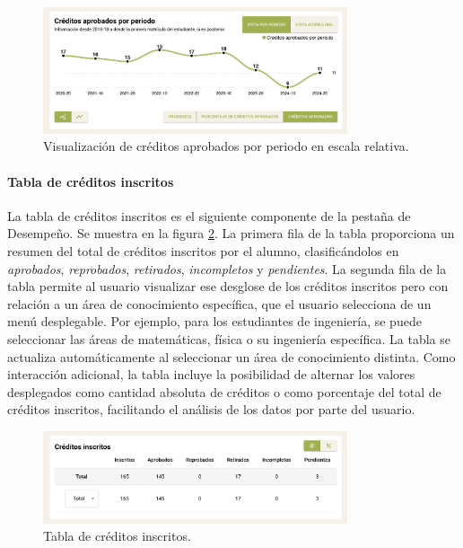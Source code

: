 \begin{enumerate}
  \begin{figure}[H]
    \centering
    \includegraphics[width=0.8\textwidth]{img/nes/creditos_periodo_relativo.png}
    \caption{Visualización de créditos aprobados por periodo en escala relativa.}
    \label{fig:creditos_periodo_relativo}
  \end{figure}
\end{enumerate}

\paragraph{Tabla de créditos inscritos} La tabla de créditos inscritos es el siguiente componente de la pestaña de Desempeño. Se muestra en la figura \ref{fig:tabla_creditos}. La primera fila de la tabla proporciona un resumen del total de créditos inscritos por el alumno, clasificándolos en \textit{aprobados}, \textit{reprobados}, \textit{retirados}, \textit{incompletos} y \textit{pendientes}. La segunda fila de la tabla permite al usuario visualizar ese desglose de los créditos inscritos pero con relación a un área de conocimiento específica, que el usuario selecciona de un menú desplegable. Por ejemplo, para los estudiantes de ingeniería, se puede seleccionar las áreas de matemáticas, física o su ingeniería específica. La tabla se actualiza automáticamente al seleccionar un área de conocimiento distinta. Como interacción adicional, la tabla incluye la posibilidad de alternar los valores desplegados como  cantidad absoluta de créditos o como porcentaje del total de créditos inscritos, facilitando el análisis de los datos por parte del usuario.

\begin{figure}[H]
  \centering
  \includegraphics[width=0.8\textwidth]{img/nes/tabla_creditos.png}
  \caption{Tabla de créditos inscritos.}
  \label{fig:tabla_creditos}
\end{figure}

